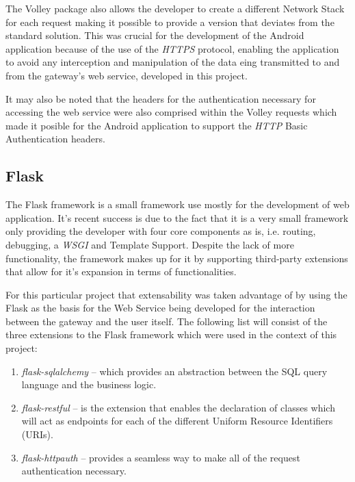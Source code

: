 The Volley package also allows the developer to create a different Network Stack
for each request making it possible to provide a version that deviates from the
standard solution. This was crucial for the development of the Android
application because of the use of the \emph{\ac{HTTPS}} protocol, enabling the
application to avoid any interception and manipulation of the data eing
transmitted to and from the gateway's web service, developed in this project.

It may also be noted that the headers for the authentication necessary for
accessing the web service were also comprised within the Volley requests which
made it posible for the Android application to support the \emph{\ac{HTTP}}
Basic Authentication headers.

\subsection{Flask}
\label{chap3:sec:tools:sub:flask}
The Flask framework is a small framework use mostly for the development of web
application. It's recent success is due to the fact that it is a very small
framework only providing the developer with four core components as is, i.e.
routing, debugging, a \emph{\ac{WSGI}} and Template Support.
Despite the lack of more functionality, the framework makes up for it by
supporting third-party extensions that allow for it's expansion in terms of
functionalities.

For this particular project that extensability was taken advantage of by using
the Flask as the basis for the Web Service being developed for the interaction
between the gateway and the user itself. The following list will consist of the
three extensions to the Flask framework which were used in the context of this
project:
\begin{enumerate}
	\item \emph{flask-sqlalchemy} -- which provides an abstraction between the
		SQL query language and the business logic.
	\item \emph{flask-restful} -- is the extension that enables the declaration
		of classes which will act as endpoints for each of the different Uniform
		Resource Identifiers (URIs).
	\item \emph{flask-httpauth} -- provides a seamless way to make all of the
		request authentication necessary.
\end{enumerate}



